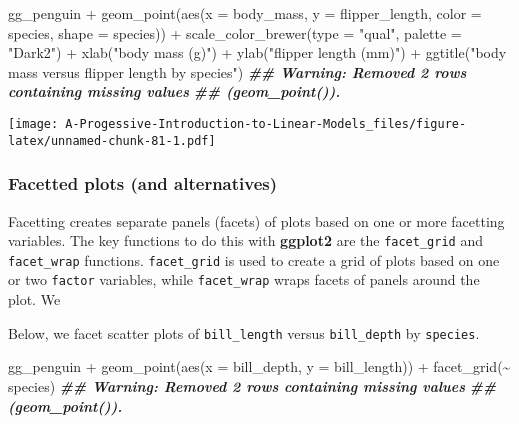 \documentclass[
]{book}
\newenvironment{Shaded}{\begin{snugshade}}{\end{snugshade}}
\newcommand{\AttributeTok}[1]{\textcolor[rgb]{0.77,0.63,0.00}{#1}}
\newcommand{\DocumentationTok}[1]{\textcolor[rgb]{0.56,0.35,0.01}{\textbf{\textit{#1}}}}
\newcommand{\FunctionTok}[1]{\textcolor[rgb]{0.00,0.00,0.00}{#1}}
\newcommand{\NormalTok}[1]{#1}
\newcommand{\SpecialCharTok}[1]{\textcolor[rgb]{0.00,0.00,0.00}{#1}}
\newcommand{\StringTok}[1]{\textcolor[rgb]{0.31,0.60,0.02}{#1}}
\theoremstyle{definition}
\theoremstyle{definition}
\theoremstyle{definition}
\theoremstyle{definition}
\theoremstyle{remark}
\begin{document}
\begin{Shaded}
\begin{Highlighting}[]
\NormalTok{gg\_penguin }\SpecialCharTok{+}
  \FunctionTok{geom\_point}\NormalTok{(}\FunctionTok{aes}\NormalTok{(}\AttributeTok{x =}\NormalTok{ body\_mass, }\AttributeTok{y =}\NormalTok{ flipper\_length,}
                 \AttributeTok{color =}\NormalTok{ species, }\AttributeTok{shape =}\NormalTok{ species)) }\SpecialCharTok{+}
  \FunctionTok{scale\_color\_brewer}\NormalTok{(}\AttributeTok{type =} \StringTok{"qual"}\NormalTok{, }\AttributeTok{palette =} \StringTok{"Dark2"}\NormalTok{) }\SpecialCharTok{+}
  \FunctionTok{xlab}\NormalTok{(}\StringTok{"body mass (g)"}\NormalTok{) }\SpecialCharTok{+} \FunctionTok{ylab}\NormalTok{(}\StringTok{"flipper length (mm)"}\NormalTok{) }\SpecialCharTok{+}
  \FunctionTok{ggtitle}\NormalTok{(}\StringTok{"body mass versus flipper length by species"}\NormalTok{)}
\DocumentationTok{\#\# Warning: Removed 2 rows containing missing values}
\DocumentationTok{\#\# (\textasciigrave{}geom\_point()\textasciigrave{}).}
\end{Highlighting}
\end{Shaded}

\texttt{[image: A-Progessive-Introduction-to-Linear-Models\_files/figure-latex/unnamed-chunk-81-1.pdf]}

\hypertarget{facetted-plots-and-alternatives}{%
\subsubsection{Facetted plots (and alternatives)}\label{facetted-plots-and-alternatives}}

Facetting creates separate panels (facets) of plots based on one or more facetting variables. The key functions to do this with \textbf{ggplot2} are the \texttt{facet\_grid} and \texttt{facet\_wrap} functions. \texttt{facet\_grid} is used to create a grid of plots based on one or two \texttt{factor} variables, while \texttt{facet\_wrap} wraps facets of panels around the plot. We

Below, we facet scatter plots of \texttt{bill\_length} versus \texttt{bill\_depth} by \texttt{species}.

\begin{Shaded}
\begin{Highlighting}[]
\NormalTok{gg\_penguin }\SpecialCharTok{+}
  \FunctionTok{geom\_point}\NormalTok{(}\FunctionTok{aes}\NormalTok{(}\AttributeTok{x =}\NormalTok{ bill\_depth, }\AttributeTok{y =}\NormalTok{ bill\_length)) }\SpecialCharTok{+}
  \FunctionTok{facet\_grid}\NormalTok{(}\SpecialCharTok{\textasciitilde{}}\NormalTok{ species)}
\DocumentationTok{\#\# Warning: Removed 2 rows containing missing values}
\DocumentationTok{\#\# (\textasciigrave{}geom\_point()\textasciigrave{}).}
\end{Highlighting}
\end{Shaded}
\end{document}
